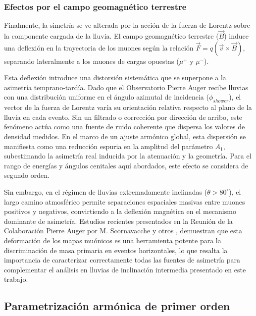\subsubsection{Efectos por el campo geomagnético terrestre}
\label{subsubsec:geomagnetico}

Finalmente, la simetría se ve alterada por la acción de la fuerza de Lorentz sobre la componente cargada de la lluvia. El campo geomagnético terrestre ($\vec{B}$) induce una deflexión en la trayectoria de los muones según la relación $\vec{F} = q(\vec{v} \times \vec{B})$, separando lateralmente a los muones de cargas opuestas ($\mu^+$ y $\mu^-$).

Esta deflexión introduce una distorsión sistemática que se superpone a la asimetría temprano-tardía. Dado que el Observatorio Pierre Auger recibe lluvias con una distribución uniforme en el ángulo azimutal de incidencia ($\phi_{shower}$), el vector de la fuerza de Lorentz varía su orientación relativa respecto al plano de la lluvia en cada evento. Sin un filtrado o corrección por dirección de arribo, este fenómeno actúa como una fuente de ruido coherente que dispersa los valores de densidad medidos. En el marco de un ajuste armónico global, esta dispersión se manifiesta como una reducción espuria en la amplitud del parámetro $A_1$, subestimando la asimetría real inducida por la atenuación y la geometría. Para el rango de energías y ángulos cenitales aquí abordados, este efecto se considera de segundo orden.

Sin embargo, en el régimen de lluvias extremadamente inclinadas ($\theta > 80^\circ$), el largo camino atmosférico permite separaciones espaciales masivas entre muones positivos y negativos, convirtiendo a la deflexión magnética en el mecanismo dominante de asimetría. Estudios recientes presentados en la Reunión de la Colaboración Pierre Auger por M. Scornavacche \cite{Scornavacche2026} y otros \cite{collaboration_2014}, demuestran que esta deformación de los mapas muónicos es una herramienta potente para la discriminación de masa primaria en eventos horizontales, lo que resalta la importancia de caracterizar correctamente todas las fuentes de asimetría para complementar el análisis en lluvias de inclinación intermedia presentado en este trabajo.

\subsection{Parametrización armónica de primer orden}
\label{subsec:parametrizacion}

